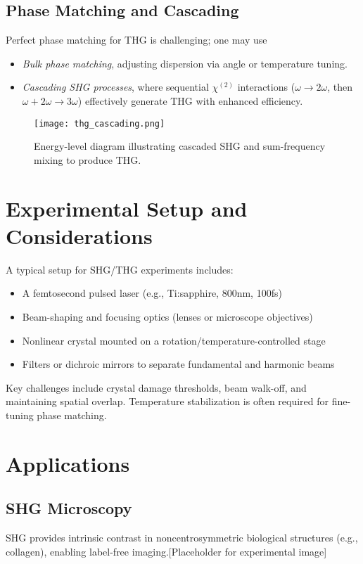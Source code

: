 \documentclass[12pt,a4paper]{article}
\begin{document}
\subsection{Phase Matching and Cascading}
Perfect phase matching for THG is challenging; one may use
\begin{itemize}
\item \emph{Bulk phase matching}, adjusting dispersion via angle or temperature tuning.
\item \emph{Cascading SHG processes}, where sequential $\chi^{(2)}$ interactions ($\omega \to 2\omega$, then $\omega+2\omega \to 3\omega$) effectively generate THG with enhanced efficiency.
\end{itemize}

\begin{figure}[h!]
\centering
\texttt{[image: thg\_cascading.png]}
\caption{Energy-level diagram illustrating cascaded SHG and sum-frequency mixing to produce THG.}
\end{figure}

\section{Experimental Setup and Considerations}
A typical setup for SHG/THG experiments includes:
\begin{itemize}
\item A femtosecond pulsed laser (e.g., Ti:sapphire, 800nm, 100fs)
\item Beam-shaping and focusing optics (lenses or microscope objectives)
\item Nonlinear crystal mounted on a rotation/temperature-controlled stage
\item Filters or dichroic mirrors to separate fundamental and harmonic beams
\end{itemize}
Key challenges include crystal damage thresholds, beam walk-off, and maintaining spatial overlap. Temperature stabilization is often required for fine-tuning phase matching.

\section{Applications}
\subsection{SHG Microscopy}
SHG provides intrinsic contrast in noncentrosymmetric biological structures (e.g., collagen), enabling label-free imaging.[Placeholder for experimental image]
\end{document}
